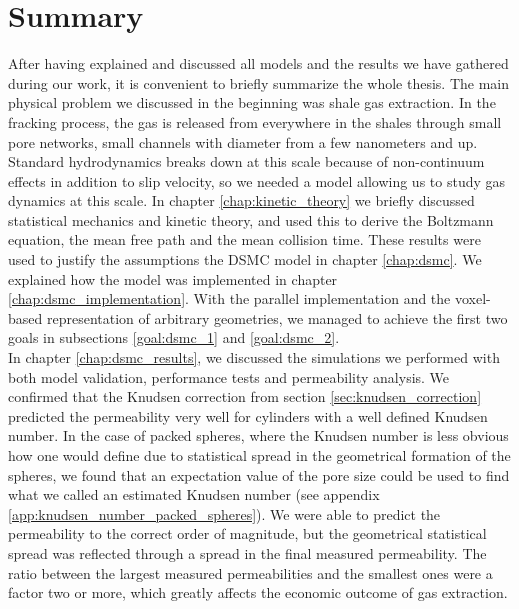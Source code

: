 \section{Summary}
After having explained and discussed all models and the results we have gathered during our work, it is convenient to briefly summarize the whole thesis. The main physical problem we discussed in the beginning was shale gas extraction. In the fracking process, the gas is released from everywhere in the shales through small pore networks, small channels with diameter from a few nanometers and up. Standard hydrodynamics breaks down at this scale because of non-continuum effects in addition to slip velocity, so we needed a model allowing us to study gas dynamics at this scale. In chapter \ref{chap:kinetic_theory} we briefly discussed statistical mechanics and kinetic theory, and used this to derive the Boltzmann equation, the mean free path and the mean collision time. These results were used to justify the assumptions the DSMC model in chapter \ref{chap:dsmc}. We explained how the model was implemented in chapter \ref{chap:dsmc_implementation}. With the parallel implementation and the voxel-based representation of arbitrary geometries, we managed to achieve the first two goals in subsections \ref{goal:dsmc_1} and \ref{goal:dsmc_2}.\\
In chapter \ref{chap:dsmc_results}, we discussed the simulations we performed with both model validation, performance tests and permeability analysis. We confirmed that the Knudsen correction from section \ref{sec:knudsen_correction} predicted the permeability very well for cylinders with a well defined Knudsen number. In the case of packed spheres, where the Knudsen number is less obvious how one would define due to statistical spread in the geometrical formation of the spheres, we found that an expectation value of the pore size could be used to find what we called an estimated Knudsen number (see appendix \ref{app:knudsen_number_packed_spheres}). We were able to predict the permeability to the correct order of magnitude, but the geometrical statistical spread was reflected through a spread in the final measured permeability. The ratio between the largest measured permeabilities and the smallest ones were a factor two or more, which greatly affects the economic outcome of gas extraction.\\
